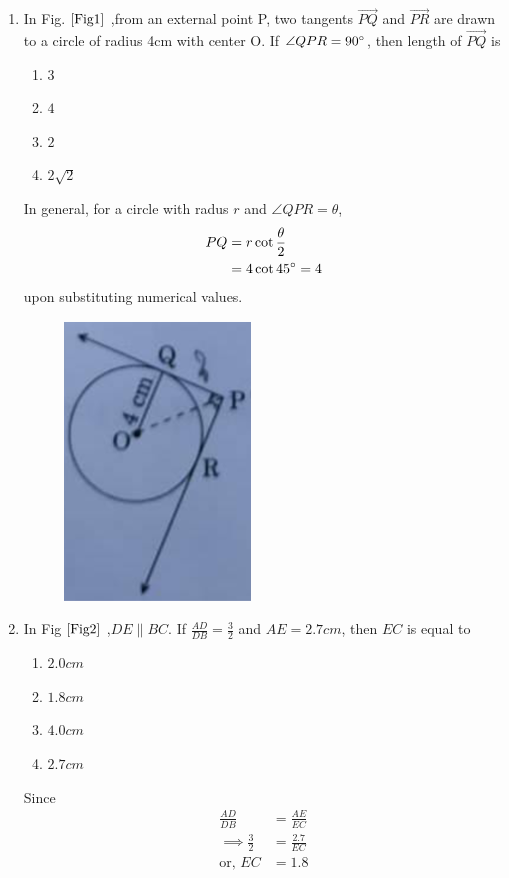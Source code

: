 \documentclass[journal,12pt,twocolumn]{IEEEtran}
\begin{document}
\begin{enumerate}
\item In Fig. $\ref{Fig1}$ ,from an external point P, two tangents $\Vec{PQ}$ and $\Vec{PR}$ are drawn to a circle of radius 4cm with center O. If $\angle{QPR} = 90\degree$, then length of $\Vec{PQ}$ is
\begin{enumerate}
    \item $3$
    \item $4$
    \item $2$
    \item $2\sqrt{2}$
\end{enumerate}
\solution In general, for a circle with radus $r$ and $\angle{QPR} = \theta$, 
\begin{align}
	PQ &= r \cot \frac{\theta}{2}
	\\
	&= 4 \cot 45 \degree = 4
\end{align}
upon substituting numerical values.
\begin{figure}[h!]
    \centering
    \includegraphics[width=0.5\columnwidth]{Fig1.png}
	\caption{}
	\label{Fig1}
 \end{figure}
 
\item In Fig $\ref{Fig2}$ ,$DE \parallel BC$. If $\frac{AD}{DB} = \frac{3}{2}$ and $AE = 2.7cm$, then $EC$ is equal to 
\begin{enumerate}
    \item $2.0 cm$
    \item $1.8 cm$
    \item $4.0 cm$
    \item $2.7 cm$
\end{enumerate}
\solution Since 
\begin{align}
	\frac{AD}{DB}  &= 
	\frac{AE}{EC}
	\\
	\implies \frac{3}{2}&= \frac{2.7}{EC}
	\\
	\text{or, }
	EC & = 1.8
\end{align}


\end{enumerate}
\end{document}
